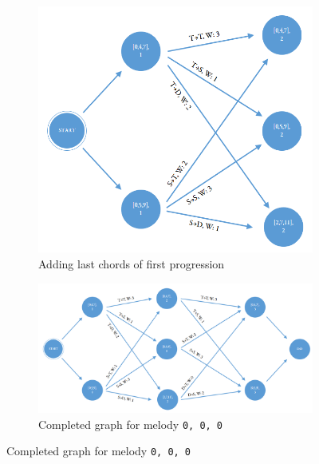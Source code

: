 \begin{figure}[!tbp]
\begin{subfigure}[b]{0.49\linewidth}
   \includegraphics[width=\linewidth]{Chapters/pic/42}
   \caption{Adding last chords of first progression}
   \label{fig:42}
\end{subfigure}

\begin{subfigure}[b]{1.2\linewidth}
   \hspace{-1.1cm}\includegraphics[width=\linewidth]{Chapters/pic/43}
   \hspace{-1.1cm}\caption{Completed graph for melody \texttt{0, 0, 0}}
   \label{fig:43}
\end{subfigure}


\end{figure}
